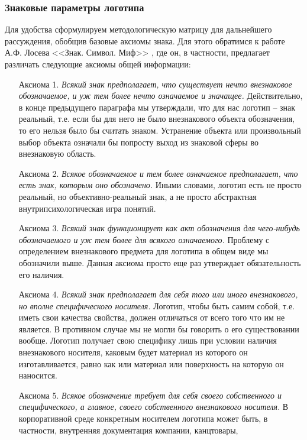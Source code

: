 \subsubsection{Знаковые параметры логотипа}
Для удобства сформулируем методологическую матрицу для дальнейшего
рассуждения, обобщив базовые аксиомы знака. Для этого обратимся к
работе А.Ф. Лосева <<Знак. Символ. Миф>> \autocite[][32-42]{losev1982}, где он, в частности,
предлагает различать следующие аксиомы общей информации:
\begin{itemize}
\item[Аксиома 1.] \emph{Всякий знак предполагает, что существует нечто внезнаковое
    обозначаемое, и уж тем более нечто означаемое и значащее.} Действительно,
  в конце предыдущего параграфа мы утверждали, что для нас логотип -- знак
  реальный, т.е. если бы для него не было внезнакового объекта обозначения,
  то его нельзя было бы считать знаком. Устранение объекта или произвольный
  выбор объекта означали бы попросту выход из знаковой сферы во внезнаковую
  область.
\item[Аксиома 2.] \emph{Всякое обозначаемое и тем более означаемое предполагает,
    что есть знак, которым оно обозначено.} Иными словами, логотип есть не просто
  реальный, но объективно-реальный знак, а не просто абстрактная
  внутрипсихологическая игра понятий.
\item[Аксиома 3.] \emph{Всякий знак функционирует как акт обозначения для
    чего-нибудь обозначаемого и уж тем более для всякого означаемого.}
  Проблему с определением внезнакового предмета для логотипа в общем виде
  мы обозначили выше. Данная аксиома просто еще раз утверждает обязательность
  его наличия.
\item[Аксиома 4.] \emph{Всякий знак предполагает для себя того или иного
    внезнакового, но вполне специфического носителя.} Логотип, чтобы быть
  самим собой, т.е. иметь свои качества свойства, должен отличаться
  от всего того что им не является. В противном случае мы не могли бы
  говорить о его существовании вообще. Логотип получает свою специфику
  лишь при условии наличия внезнакового носителя, каковым будет
  материал из которого он изготавливается, равно как или материал или
  поверхность на которую он наносится.
\item[Аксиома 5.] \emph{Всякое обозначение требует для себя своего
    собственного и специфического, а главное, своего собственного внезнакового
    носителя.} В корпоративной среде конкретным носителем логотипа может быть,
  в частности, внутренняя документация компании, канцтовары,

\end{itemize}
